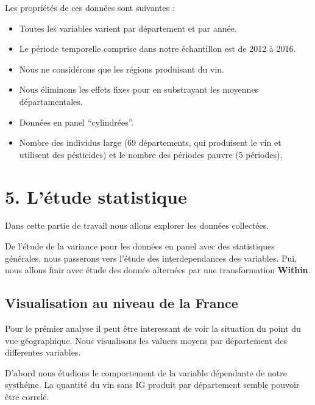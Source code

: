 \documentclass[11pt,]{article}
\providecommand{\tightlist}{%
  \setlength{\itemsep}{0pt}\setlength{\parskip}{0pt}}
\begin{document}
Les propriétés de ces données sont suivantes :

\begin{itemize}
\tightlist
\item
  Toutes les variables varient par département et par année.
\item
  Le période temporelle comprise dans notre échantillon est de 2012 à
  2016.
\item
  Nous ne considérons que les régions produisant du vin.
\item
  Nous éliminons les effets fixes pour en substrayant les moyennes
  départamentales.
\item
  Données en panel ``cylindrées''.
\item
  Nombre des individus large (69 départements, qui produisent le vin et
  utilisent des pésticides) et le nombre des périodes pauvre (5
  périodes).
\end{itemize}

\hypertarget{letude-statistique}{%
\section{5. L'étude statistique}\label{letude-statistique}}

Dans cette partie de travail nous allons explorer les données
collectées.

De l'étude de la variance pour les données en panel avec des
statistiques générales, nous passerons vers l'étude des interdependances
des variables. Pui, nous allons finir avec étude des donnée alternées
par une transformation \textbf{Within}.

\hypertarget{visualisation-au-niveau-de-la-france}{%
\subsection{Visualisation au niveau de la
France}\label{visualisation-au-niveau-de-la-france}}

Pour le prémier analyse il peut être interessant de voir la situation du
point du vue géographique. Nous visualisons les valuers moyens par
département des differentes variables.

D'abord nous étudions le comportement de la variable dépendante de notre
systhéme. La quantité du vin sans IG produit par département semble
pouvoir être correlé.

\FloatBarrier
\end{document}
